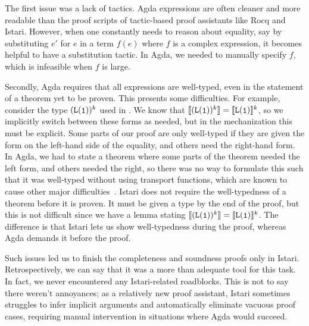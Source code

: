 The first issue was a lack of tactics. Agda expressions are often cleaner and more readable than the proof scripts of tactic-based proof assistants like Rocq and Istari. However, when one constantly needs to reason about equality, say by substituting $e'$ for $e$ in a term $f(e)$ where $f$ is a complex expression, it becomes helpful to have a substitution tactic. In Agda, we needed to manually specify $f$, which is infeasible when $f$ is large.

Secondly, Agda requires that all expressions are well-typed, even in the statement of a theorem yet to be proven. This presents some difficulties. For example, consider the \lfpl type $(\tplist{\tpunit})^k$ used in . We know that $\tpsem{(\tplist{\tpunit})^k} = \tpsem{\tplist{\tpunit}}^k$, so we implicitly switch between these forms as needed, but in the mechanization this must be explicit. Some parts of our proof are only well-typed if they are given the form on the left-hand side of the equality, and others need the right-hand form. In Agda, we had to state a theorem where some parts of the theorem needed the left form, and others needed the right, so there was no way to formulate this such that it was well-typed without using transport functions, which are known to cause other major difficulties~\cite{tabareau2018}. Istari does not require the well-typedness of a theorem before it is proven. It must be given a type by the end of the proof, but this is not difficult since we have a lemma stating $\tpsem{(\tplist{\tpunit})^k} = \tpsem{\tplist{\tpunit}}^k$. The difference is that Istari lets us show well-typedness during the proof, whereas Agda demands it before the proof.

Such issues led us to finish the completeness and soundness proofs only in Istari. Retrospectively, we can say that it was a more than adequate tool for this task. In fact, we never encountered any Istari-related roadblocks. This is not to say there weren't annoyances; as a relatively new proof assistant, Istari sometimes struggles to infer implicit arguments and automatically eliminate vacuous proof cases, requiring manual intervention in situations where Agda would succeed.
